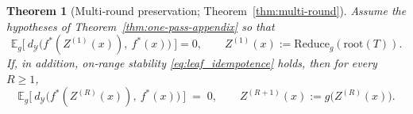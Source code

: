 \documentclass[11pt]{article}
\newtheorem{theorem}{Theorem}
\newtheorem{corollary}{Corollary}
\newcommand{\Y}{\mathcal{Y}}               %
\newcommand{\fstar}{f^*}               %
\newcommand{\E}{\mathbb{E}}
\newcommand{\concat}{\oplus}                    %
\newcommand{\metric}{d_{\Y}}
\newcommand{\reduce}{\text{Reduce}}
\newcommand{\reduceg}{\reduce_g}
\newcommand{\Eg}{\E_g}     %
\begin{document}



\begin{theorem}[Multi‑round preservation; Theorem~\ref{thm:multi-round}]
\label{thm:multi-round-appendix}
Assume the hypotheses of Theorem~\ref{thm:one-pass-appendix} so that
\[
\Eg\!\Big[\ \metric\!\big(\fstar(Z^{(1)}(x)),\ \fstar(x)\big)\ \Big]=0,\qquad Z^{(1)}(x):=\reduceg(\mathrm{root}(T)).
\]
If, in addition, on‑range stability \eqref{eq:leaf_idempotence} holds, then for every $R\ge 1$,
\[
\Eg\!\Big[\ \metric\!\big(\fstar(Z^{(R)}(x)),\ \fstar(x)\big)\ \Big]\;=\;0,
\qquad Z^{(R+1)}(x):=g\!\big(Z^{(R)}(x)\big).
\]
\end{theorem}
\end{document}
